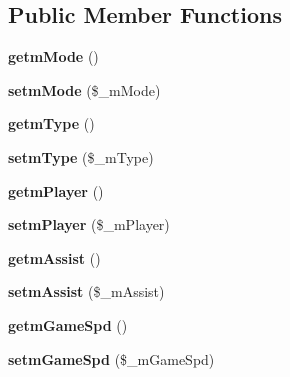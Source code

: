 \subsection*{Public Member Functions}
\begin{DoxyCompactItemize}
\item 
\mbox{\label{class_reversi_setting_a4ed7f3bdbf5c81ccb1d7a110b784d729}} 
{\bfseries getm\+Mode} ()
\item 
\mbox{\label{class_reversi_setting_a39167d7120c0f7be3d71fb8b36d4b2d2}} 
{\bfseries setm\+Mode} (\$\+\_\+m\+Mode)
\item 
\mbox{\label{class_reversi_setting_a4a6f8c370ba7f56090a4589dd764985c}} 
{\bfseries getm\+Type} ()
\item 
\mbox{\label{class_reversi_setting_ad32dae55a2718993d5b0cf9e85a9a201}} 
{\bfseries setm\+Type} (\$\+\_\+m\+Type)
\item 
\mbox{\label{class_reversi_setting_a5070a9ab795fa2f316723066dd9ee7ca}} 
{\bfseries getm\+Player} ()
\item 
\mbox{\label{class_reversi_setting_a31f291d8896090ba483ce66a62268843}} 
{\bfseries setm\+Player} (\$\+\_\+m\+Player)
\item 
\mbox{\label{class_reversi_setting_addf31d3fffb8c3d095e7be3fc29e72e6}} 
{\bfseries getm\+Assist} ()
\item 
\mbox{\label{class_reversi_setting_a828afe27a985d264802d155f22cc69c1}} 
{\bfseries setm\+Assist} (\$\+\_\+m\+Assist)
\item 
\mbox{\label{class_reversi_setting_aa68659744b5089035ba6e945e4d566c8}} 
{\bfseries getm\+Game\+Spd} ()
\item 
\mbox{\label{class_reversi_setting_afdb2caa1a2e59f8c25d27c8d4eba2055}} 
{\bfseries setm\+Game\+Spd} (\$\+\_\+m\+Game\+Spd)
\item 
\mbox{\label{class_reversi_setting_a9c96042c1a1c482e4083d5aff613974a}} 

\end{DoxyCompactItemize}

